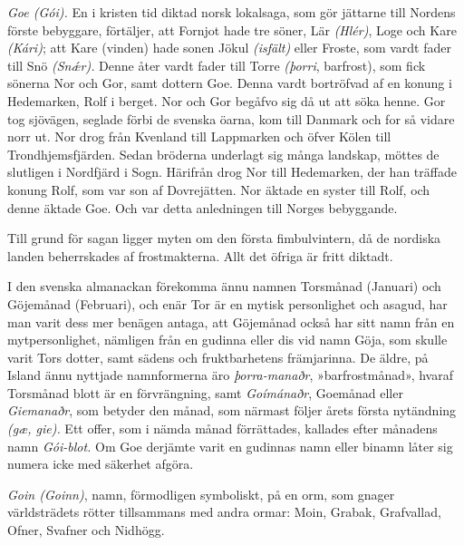 \emph{Goe (Gói).} En i kristen tid diktad norsk lokalsaga, som gör
jättarne till Nordens förste bebyggare, förtäljer, att Fornjot hade tre
söner, Lär \emph{(Hlér)}, Loge och Kare \emph{(Kári)}; att Kare (vinden)
hade sonen Jökul \emph{(isfält)} eller Froste, som vardt fader till Snö
\emph{(Snǽr).} Denne åter vardt fader till Torre \emph{(þorri},
barfrost), som fick sönerna Nor och Gor, samt dottern Goe. Denna vardt
bortröfvad af en konung i Hedemarken, Rolf i berget. Nor och Gor begåfvo
sig då ut att söka henne. Gor tog sjövägen, seglade förbi de svenska
öarna, kom till Danmark och for så vidare norr ut. Nor drog från
Kvenland till Lappmarken och öfver Kölen till Trondhjemsfjärden. Sedan
bröderna underlagt sig många landskap, möttes de slutligen i Nordfjärd i
Sogn. Härifrån drog Nor till Hedemarken, der han träffade konung Rolf,
som var son af Dovrejätten. Nor äktade en syster till Rolf, och denne
äktade Goe. Och var detta anledningen till Norges bebyggande.

Till grund för sagan ligger myten om den första fimbulvintern, då de
nordiska landen beherrskades af frostmakterna. Allt det öfriga är fritt
diktadt.

I den svenska almanackan förekomma ännu namnen Torsmånad (Januari) och
Göjemånad (Februari), och enär Tor är en mytisk personlighet och asagud,
har man varit dess mer benägen antaga, att Göjemånad också har sitt namn
från en mytpersonlighet, nämligen från en gudinna eller dis vid namn
Göja, som skulle varit Tors dotter, samt sädens och fruktbarhetens
främjarinna. De äldre, på Island ännu nyttjade namnformerna äro
\emph{þorra-manaðr}, »barfrostmånad», hvaraf Torsmånad blott är en
förvrängning, samt \emph{Goímánaðr}, Goemånad eller \emph{Giemanaðr},
som betyder den månad, som närmast följer årets första nytändning
\emph{(gæ, gie).} Ett offer, som i nämda månad förrättades, kallades
efter månadens namn \emph{Gói-blot.} Om Goe derjämte varit en gudinnas
namn eller binamn låter sig numera icke med säkerhet afgöra.

\emph{Goin (Goinn)}, namn, förmodligen symboliskt, på en orm, som gnager
världsträdets rötter tillsammans med andra ormar: Moin, Grabak,
Grafvallad, Ofner, Svafner och Nidhögg.

\protect\hypertarget{lb1625905.xhtmlux5cux23start220}{}{}\protect\hypertarget{lb1625905.xhtmlux5cux23start220-a}{}{}\protect\hypertarget{lb1625905.xhtmlux5cux23start220-b}{}{}\protect\hypertarget{lb1625905.xhtmlux5cux23start220-c}{}{}\protect\hypertarget{lb1625905.xhtmlux5cux23start220-d}{}{}

